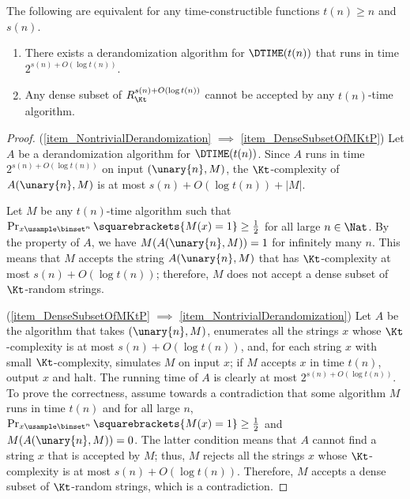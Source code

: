 \documentclass{toc}
\begin{document}
\begin{proposition}
  \label{prop_DenseSubsetOfKt}
  The following are equivalent for any time-constructible functions $t(n) \ge n$ and $s(n)$.
  \begin{enumerate}
    \item
          \label{item_NontrivialDerandomization}
          There exists a derandomization algorithm for $\DTIME(t(n))$ that runs in time $2^{s(n) + O(\log t(n))}$.
    \item
          \label{item_DenseSubsetOfMKtP}
          Any dense subset of $R_\Kt^{s(n) + O(\log t(n))}$ cannot be accepted by any $t(n)$-time algorithm.
  \end{enumerate}
\end{proposition}
\begin{proof}
  (\cref{item_NontrivialDerandomization} $\implies$ \cref{item_DenseSubsetOfMKtP})
  Let $A$ be a derandomization algorithm for $\DTIME(t(n))$.
  Since $A$ runs in time $2^{s(n) + O(\log t(n))}$ on input $(\unary{n}, M)$,
  the $\Kt$-complexity of $A(\unary{n}, M)$ is at most $s(n) + O(\log t(n)) + |M|$.

  Let $M$ be any $t(n)$-time algorithm such that $\Pr_{x \usample \binset^n} \squarebrackets{ M(x) = 1 } \ge \frac{1}{2}$
  for all large $n \in \Nat$.
  By the property of $A$, we have $M(A(\unary{n}, M)) = 1$ for infinitely many $n$.
  This means that $M$ accepts the string $A(\unary{n}, M)$ that has $\Kt$-complexity at most $s(n) + O(\log t(n))$;
  therefore, $M$ does not accept a dense subset of $\Kt$-random strings.

  (\cref{item_DenseSubsetOfMKtP} $\implies$ \cref{item_NontrivialDerandomization})
  Let $A$ be the algorithm that
  takes $(\unary{n}, M)$,
  enumerates all the strings $x$ whose $\Kt$-complexity is at most $s(n) + O(\log t(n))$,
  and,
  for each string $x$ with small $\Kt$-complexity,
  simulates $M$ on input $x$; if $M$ accepts $x$ in time $t(n)$, output $x$ and halt.
  The running time of $A$ is clearly at most $2^{s(n) + O(\log t(n))}$.
  To prove the correctness, assume towards a contradiction that some algorithm $M$ runs in time $t(n)$ and for all large $n$,
  $\Pr_{x \usample \binset^n} \squarebrackets{ M(x) = 1 } \ge \frac{1}{2}$ and $M(A(\unary{n}, M)) = 0$.
  The latter condition means that $A$ cannot find a string $x$ that is accepted by $M$; thus,
  $M$ rejects all the strings $x$ whose $\Kt$-complexity is at most $s(n) + O(\log t(n))$.
  Therefore, $M$ accepts a dense subset of $\Kt$-random strings, which is a contradiction.
\end{proof}
\end{document}
